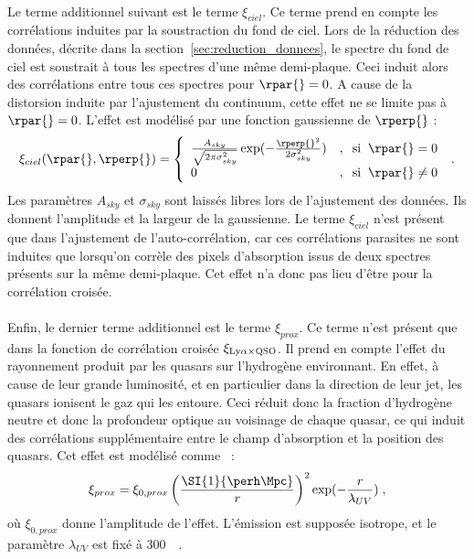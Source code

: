 \paragraph{}
Le terme additionnel suivant est le terme $\xi_{ciel}$. Ce terme prend en compte les corrélations induites par la soustraction du fond de ciel. Lors de la réduction des données, décrite dans la section~\ref{sec:reduction_donnees}, le spectre du fond de ciel est soustrait à tous les spectres d'une même demi-plaque. Ceci induit alors des corrélations entre tous ces spectres pour $\rpar{} = 0$. A cause de la distorsion induite par l'ajustement du continuum, cette effet ne se limite pas à $\rpar{} = 0$.
L'effet est modélisé par une fonction gaussienne de $\rperp{}$ :
\begin{equation}
  \xi_{ciel}(\rpar{}, \rperp{}) =
  \left\{
    \begin{array}{ll}
      \frac{A_{sky}}{\sqrt{2 \pi \sigma_{sky}^{2}}} \exp(- \frac{\rperp{}^2}{2 \sigma_{sky}^2}) & , \hspace{0.2cm} \mathrm{si} \hspace{0.2cm} \rpar{} = 0 \\
      0 & ,  \hspace{0.2cm} \mathrm{si} \hspace{0.2cm}  \rpar{} \neq 0
    \end{array}
\right.  \; .
\end{equation}
Les paramètres $A_{sky}$ et $\sigma_{sky}$ sont laissés libres lors de l'ajustement des données. Ils donnent l'amplitude et la largeur de la gaussienne.
Le terme $\xi_{ciel}$ n'est présent que dans l'ajustement de l'auto-corrélation, car ces corrélations parasites ne sont induites que lorsqu'on corrèle des pixels d'absorption issus de deux spectres présents sur la même demi-plaque. Cet effet n'a donc pas lieu d'être pour la corrélation croisée.

\paragraph{}
Enfin, le dernier terme additionnel est le terme $\xi_{prox}$. Ce terme n'est présent que dans la fonction de corrélation croisée $\xi_{\mathrm{Ly}\alpha\times\textsc{QSO}}$. Il prend en compte l'effet du rayonnement produit par les quasars sur l'hydrogène environnant. En effet, à cause de leur grande luminosité, et en particulier dans la direction de leur jet, les quasars ionisent le gaz qui les entoure. Ceci réduit donc la fraction d'hydrogène neutre et donc la profondeur optique au voisinage de chaque quasar, ce qui induit des corrélations supplémentaire entre le champ d'absorption \lya{} et la position des quasars. Cet effet est modélisé comme~\autocite{Font-Ribera2013} :
\begin{equation}
  \xi_{prox} = \xi_{0,prox} \left(\frac{\SI{1}{\perh\Mpc}}{r} \right)^2 \exp( - \frac{r}{\lambda_{UV}}) \; ,
\end{equation}
où $\xi_{0,prox}$ donne l'amplitude de l'effet. L'émission est supposée isotrope, et le paramètre $\lambda_{UV}$ est fixé à \SI{300}{\perh\Mpc}.


